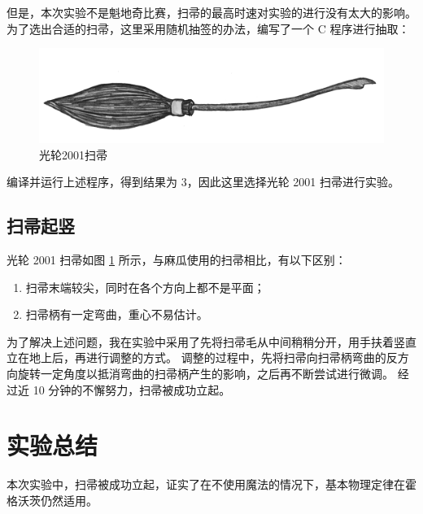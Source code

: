 \documentclass[12pt,a4paper,UTF8]{article}
\begin{document}
  但是，本次实验不是魁地奇比赛，扫帚的最高时速对实验的进行没有太大的影响。
  为了选出合适的扫帚，这里采用随机抽签的办法，编写了一个 C 程序进行抽取：

  

  \begin{landscape}
    \begin{figure}
      \centering
      \includegraphics[width=\linewidth]{Nimbus2001}
      \caption{光轮2001扫帚}
      \label{Nimbus2001}
    \end{figure}
  \end{landscape}

  编译并运行上述程序，得到结果为 3，因此这里选择光轮 2001 扫帚进行实验。

  \subsection{扫帚起竖}
  光轮 2001 扫帚如图 \ref{Nimbus2001} 所示，与麻瓜使用的扫帚相比，有以下区别：
  \begin{enumerate}
    \item 扫帚末端较尖，同时在各个方向上都不是平面；
    \item 扫帚柄有一定弯曲，重心不易估计。
  \end{enumerate}

  为了解决上述问题，我在实验中采用了先将扫帚毛从中间稍稍分开，用手扶着竖直立在地上后，再进行调整的方式。
  调整的过程中，先将扫帚向扫帚柄弯曲的反方向旋转一定角度以抵消弯曲的扫帚柄产生的影响，之后再不断尝试进行微调。
  经过近 10 分钟的不懈努力，扫帚被成功立起。

  \section{实验总结}
  本次实验中，扫帚被成功立起，证实了在不使用魔法的情况下，基本物理定律在霍格沃茨仍然适用。
\end{document}

